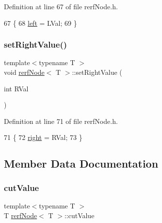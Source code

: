 Definition at line 67 of file rerf\+Node.\+h.


\begin{DoxyCode}
67                                           \{
68             \hyperlink{classrerfNode_a0ffbd4e13914bfdd0d35e2e737b0a959}{left} = LVal;    
69         \}
\end{DoxyCode}
\mbox{\label{classrerfNode_a9561bbd59f5aa7b2beef6d520d89d4ad}} 
\subsubsection{\texorpdfstring{set\+Right\+Value()}{setRightValue()}}
{\footnotesize\ttfamily template$<$typename T $>$ \\
void \hyperlink{classrerfNode}{rerf\+Node}$<$ T $>$\+::set\+Right\+Value (\begin{DoxyParamCaption}\item[{int}]{R\+Val }\end{DoxyParamCaption})\hspace{0.3cm}{\ttfamily [inline]}}



Definition at line 71 of file rerf\+Node.\+h.


\begin{DoxyCode}
71                                            \{
72             \hyperlink{classrerfNode_ae04521c833fe33f2b1cde19bb3cb615f}{right} = RVal;
73         \}
\end{DoxyCode}


\subsection{Member Data Documentation}
\mbox{\label{classrerfNode_afbb93d044e16d18d7502e5d58fa345bf}} 
\subsubsection{\texorpdfstring{cut\+Value}{cutValue}}
{\footnotesize\ttfamily template$<$typename T $>$ \\
T \hyperlink{classrerfNode}{rerf\+Node}$<$ T $>$\+::cut\+Value\hspace{0.3cm}{\ttfamily [protected]}}



